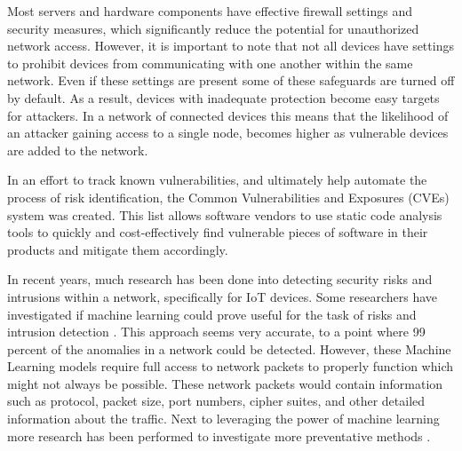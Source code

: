 Most servers and hardware components have effective firewall settings and security measures, which significantly reduce the potential for unauthorized network access. However, it is important to note that not all devices have settings to prohibit devices from communicating with one another within the same network. Even if these settings are present some of these safeguards are turned off by default. As a result, devices with inadequate protection become easy targets for attackers. In a network of connected devices this means that the likelihood of an attacker gaining access to a single node, becomes higher as vulnerable devices are added to the network.

In an effort to track known vulnerabilities, and ultimately help automate the process of risk identification, the Common Vulnerabilities and Exposures (CVEs) system was created. This list allows software vendors to use static code analysis tools to quickly and cost-effectively find vulnerable pieces of software in their products and mitigate them accordingly. 


In recent years, much research has been done into detecting security risks and intrusions within a network, specifically for IoT devices. Some researchers have investigated if machine learning could prove useful for the task of risks and intrusion detection \cite{canedo2016using, doshi2018machine, hamza2019detecting, sivanathan2018classifying}. 
 This approach seems very accurate, to a point where 99 percent of the anomalies in a network could be detected. However, these Machine Learning models require full access to network packets to properly function which might not always be possible. These network packets would contain information such as protocol, packet size, port numbers, cipher suites, and other detailed information about the traffic. Next to leveraging the power of machine learning more research has been performed to investigate more preventative methods \cite{miettinen2017iot, hamza2019detecting, paudel2019detecting}.

